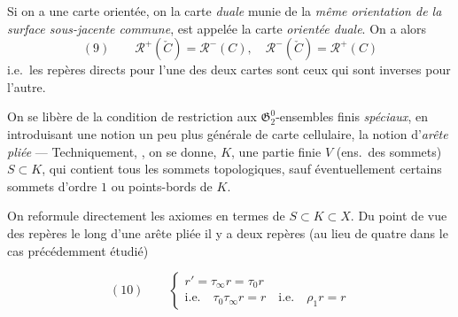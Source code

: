 \documentclass[11pt,a4paper]{article}
\begin{document}
Si on a une carte orientée, on  la carte \emph{duale} munie de la \emph{même orientation de la surface sous-jacente commune}, est appelée la carte \emph{orientée duale}. On a alors
\[
  (9)\qquad \mathcal{R}^{+}(\check C) = \mathcal{R}^{-}(C), \quad \mathcal{R}^{-}(\check C) = \mathcal{R}^{+}(C)
\]
i.e.\ les repères directs pour l'une des deux cartes sont ceux qui sont inverses pour l'autre.

On se libère de la condition de restriction aux $\mathfrak{G}_{2}^{0}$-ensembles finis \emph{spéciaux}, en introduisant une notion un peu plus générale de carte cellulaire,   la notion \struck{\ill{}} d'\emph{arête pliée} --- Techniquement, \ill{}, on se donne,  $K$, une partie finie $V$ (ens.\ des sommets) $S \subset K$, qui contient tous les sommets topologiques, sauf éventuellement certains sommets d'ordre $1$ ou points-bords de $K$.




On reformule directement les axiomes en termes de $S \subset K \subset X$. Du point de vue des repères le long d'une arête pliée il y a deux repères (au lieu de quatre dans le cas précédemment étudié)


\[
  (10)\qquad
  \begin{cases}
    r' = \tau_{\infty}r = \tau_{0}r \\
    \text{i.e.}\quad \tau_{0}\tau_{\infty}r = r \quad \text{i.e.}\quad \rho_{1}r = r
  \end{cases}
\]
\end{document}
